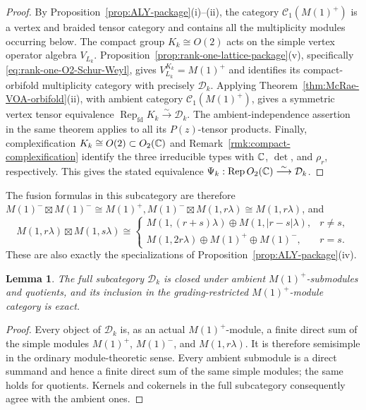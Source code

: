 \documentclass[10pt,a4paper]{amsart}
\numberwithin{equation}{section} \newtheorem{thm}{Theorem}[section] \newtheorem{lem}[thm]{Lemma} \newtheorem{ex}[thm]{Example} \newtheorem{prop}[thm]{Proposition} \newtheorem{cor}[thm]{Corollary} \newtheorem{defi}[thm]{Definition} \newtheorem{rmk}[thm]{Remark} \newtheorem{notation}[thm]{Notation}
\newcommand{\Rep}{\operatorname{Rep}}
\newcommand{\Dk}{\mathcal D_k}
\newcommand{\Otwo}{O_2(\C)}
\begin{document}
\begin{proof}
By Proposition~\ref{prop:ALY-package}(i)--(ii), the category $\mathcal C_1(M(1)^+)$ is a vertex and braided tensor category and contains all the multiplicity modules occurring below. The compact group \(K_k\cong O(2)\) acts on the simple vertex operator algebra $V_{L_k}$. Proposition~\ref{prop:rank-one-lattice-package}(v), specifically \eqref{eq:rank-one-O2-Schur-Weyl}, gives \(V_{L_k}^{K_k}=M(1)^+\) and identifies its compact-orbifold multiplicity category with precisely $\Dk$. Applying Theorem~\ref{thm:McRae-VOA-orbifold}(ii), with ambient category $\mathcal C_1(M(1)^+)$, gives a symmetric vertex tensor equivalence \(\Rep_{\mathrm{fd}}K_k\overset{\sim}{\longrightarrow}\Dk\). The ambient-independence assertion in the same theorem applies to all its $P(z)$-tensor products. Finally, complexification $K_k\cong O(2)\subset \Otwo$ and Remark~\ref{rmk:compact-complexification} identify the three irreducible types with $\mathbb{C}$, $\det$, and $\rho_r$, respectively. This gives the stated equivalence \(\Psi_k:\Rep\Otwo\overset{\sim}{\longrightarrow}\Dk\).
\end{proof}

The fusion formulas in this subcategory are therefore \(M(1)^-\boxtimes M(1)^-\cong M(1)^+, M(1)^-\boxtimes M(1,r\lambda)\cong M(1,r\lambda)\), and
\[
M(1,r\lambda)\boxtimes M(1,s\lambda)\cong
\begin{cases}
M(1,(r+s)\lambda)\oplus M(1,|r-s|\lambda),&r\ne s,\\
M(1,2r\lambda)\oplus M(1)^+\oplus M(1)^-,&r=s.
\end{cases}
\]
These are also exactly the specializations of Proposition~\ref{prop:ALY-package}(iv).

\begin{lem}\label{lem:Dk-ambient-Serre}
The full subcategory $\Dk$ is closed under ambient $M(1)^+$-submodules and quotients, and its inclusion in the grading-restricted $M(1)^+$-module category is exact.
\end{lem}

\begin{proof}
Every object of $\Dk$ is, as an actual $M(1)^+$-module, a finite direct sum of the simple modules $M(1)^+$, $M(1)^-$, and $M(1,r\lambda)$. It is therefore semisimple in the ordinary module-theoretic sense. Every ambient submodule is a direct summand and hence a finite direct sum of the same simple modules; the same holds for quotients. Kernels and cokernels in the full subcategory consequently agree with the ambient ones.
\end{proof}
\end{document}
